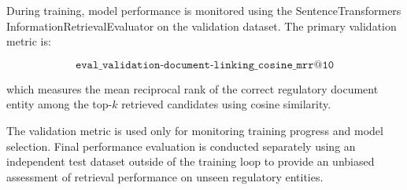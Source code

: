 During training, model performance is monitored using the SentenceTransformers InformationRetrievalEvaluator on the validation dataset. The primary validation metric is:

\[
\texttt{eval\_validation-document-linking\_cosine\_mrr@10}
\]

which measures the mean reciprocal rank of the correct regulatory document entity among the top-$k$ retrieved candidates using cosine similarity.

The validation metric is used only for monitoring training progress and model selection. Final performance evaluation is conducted separately using an independent test dataset outside of the training loop to provide an unbiased assessment of retrieval performance on unseen regulatory entities.


